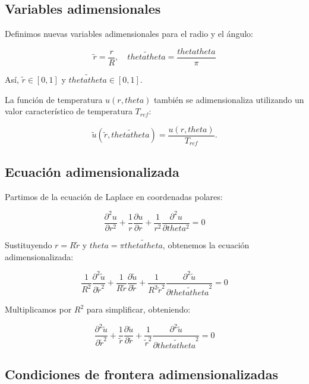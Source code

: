 \subsection{Variables adimensionales}

Definimos nuevas variables adimensionales para el radio y el ángulo:

\[
\tilde{r} = \frac{r}{R}, \quad \tilde{thetatheta} = \frac{thetatheta}{\pi}
\]

Así, \( \tilde{r} \in [0, 1] \) y \( \tilde{thetatheta} \in [0, 1] \).

La función de temperatura \( u(r, theta) \) también se adimensionaliza utilizando un valor característico de temperatura \( T_{ref} \):

\[
\tilde{u}(\tilde{r}, \tilde{thetatheta}) = \frac{u(r, theta)}{T_{ref}}.
\]

\subsection{Ecuación adimensionalizada}

Partimos de la ecuación de Laplace en coordenadas polares:

\begin{equation}
    \frac{\partial^2 u}{\partial r^2} + \frac{1}{r} \frac{\partial u}{\partial r} + \frac{1}{r^2} \frac{\partial^2 u}{\partial theta^2} = 0
\end{equation}

Sustituyendo \( r = R \tilde{r} \) y \( theta = \pi \tilde{thetatheta} \), obtenemos la ecuación adimensionalizada:

\begin{equation}
    \frac{1}{R^2} \frac{\partial^2 \tilde{u}}{\partial \tilde{r}^2} + \frac{1}{R \tilde{r}} \frac{\partial \tilde{u}}{\partial \tilde{r}} + \frac{1}{R^2 \tilde{r}^2} \frac{\partial^2 \tilde{u}}{\partial \tilde{thetatheta}^2} = 0
\end{equation}

Multiplicamos por \( R^2 \) para simplificar, obteniendo:

\begin{equation}
    \frac{\partial^2 \tilde{u}}{\partial \tilde{r}^2} + \frac{1}{\tilde{r}} \frac{\partial \tilde{u}}{\partial \tilde{r}} + \frac{1}{\tilde{r}^2} \frac{\partial^2 \tilde{u}}{\partial \tilde{thetatheta}^2} = 0
\end{equation}

\subsection{Condiciones de frontera adimensionalizadas}


